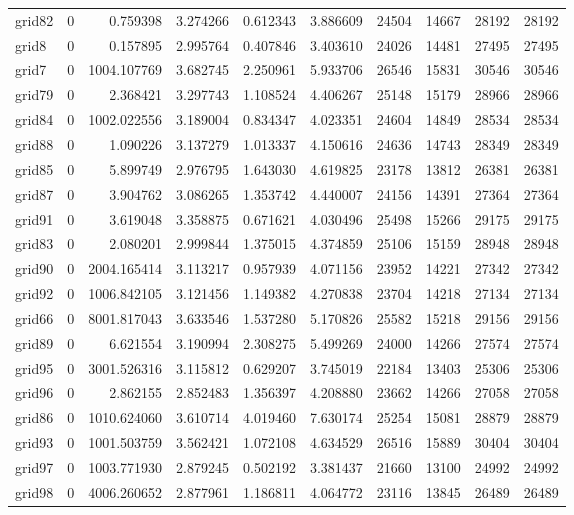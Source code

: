 \begin{longtable}{|l|r|r|r|r|r|r|r|r|r|}
grid82 & 0 & 0.759398 & 3.274266 & 0.612343 & 3.886609 & 24504 & 14667 & 28192 & 28192 \\
grid8 & 0 & 0.157895 & 2.995764 & 0.407846 & 3.403610 & 24026 & 14481 & 27495 & 27495 \\
grid7 & 0 & 1004.107769 & 3.682745 & 2.250961 & 5.933706 & 26546 & 15831 & 30546 & 30546 \\
grid79 & 0 & 2.368421 & 3.297743 & 1.108524 & 4.406267 & 25148 & 15179 & 28966 & 28966 \\
grid84 & 0 & 1002.022556 & 3.189004 & 0.834347 & 4.023351 & 24604 & 14849 & 28534 & 28534 \\
grid88 & 0 & 1.090226 & 3.137279 & 1.013337 & 4.150616 & 24636 & 14743 & 28349 & 28349 \\
grid85 & 0 & 5.899749 & 2.976795 & 1.643030 & 4.619825 & 23178 & 13812 & 26381 & 26381 \\
grid87 & 0 & 3.904762 & 3.086265 & 1.353742 & 4.440007 & 24156 & 14391 & 27364 & 27364 \\
grid91 & 0 & 3.619048 & 3.358875 & 0.671621 & 4.030496 & 25498 & 15266 & 29175 & 29175 \\
grid83 & 0 & 2.080201 & 2.999844 & 1.375015 & 4.374859 & 25106 & 15159 & 28948 & 28948 \\
grid90 & 0 & 2004.165414 & 3.113217 & 0.957939 & 4.071156 & 23952 & 14221 & 27342 & 27342 \\
grid92 & 0 & 1006.842105 & 3.121456 & 1.149382 & 4.270838 & 23704 & 14218 & 27134 & 27134 \\
grid66 & 0 & 8001.817043 & 3.633546 & 1.537280 & 5.170826 & 25582 & 15218 & 29156 & 29156 \\
grid89 & 0 & 6.621554 & 3.190994 & 2.308275 & 5.499269 & 24000 & 14266 & 27574 & 27574 \\
grid95 & 0 & 3001.526316 & 3.115812 & 0.629207 & 3.745019 & 22184 & 13403 & 25306 & 25306 \\
grid96 & 0 & 2.862155 & 2.852483 & 1.356397 & 4.208880 & 23662 & 14266 & 27058 & 27058 \\
grid86 & 0 & 1010.624060 & 3.610714 & 4.019460 & 7.630174 & 25254 & 15081 & 28879 & 28879 \\
grid93 & 0 & 1001.503759 & 3.562421 & 1.072108 & 4.634529 & 26516 & 15889 & 30404 & 30404 \\
grid97 & 0 & 1003.771930 & 2.879245 & 0.502192 & 3.381437 & 21660 & 13100 & 24992 & 24992 \\
grid98 & 0 & 4006.260652 & 2.877961 & 1.186811 & 4.064772 & 23116 & 13845 & 26489 & 26489 \\

\end{longtable}
